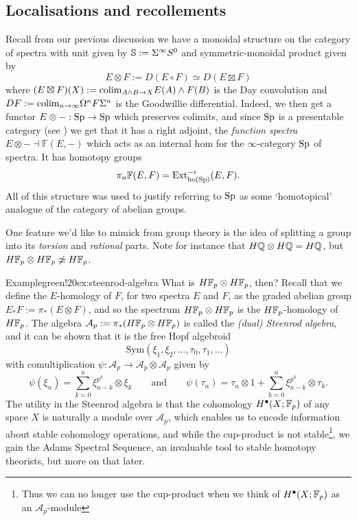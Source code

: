 \subsection{Localisations and recollements}\label{sec:localisations}

Recall from our previous discussion we have a monoidal structure on the category of spectra with unit given by $\S := \Sigma^\infty S^0$ and symmetric-monoidal product given by
	\[
	E \otimes F 
	:= D(E \circ F)
	\simeq D(E \boxtimes F)
	\]
	where $(E \boxtimes F)(X) := \colim_{A \wedge B \to X} E(A) \wedge F(B)$ is the Day convolution and $DF := \colim_{n\to\infty} \Omega^n F \Sigma^n$ is the Goodwillie differential. Indeed, we then get a functor $E\otimes-:\Sp\to\Sp$ which preserves colimits, and since $\Sp$ is a presentable category (see \cite{HA}) we get that it has a right adjoint, the \textit{function spectra} $E\otimes- \dashv \mathbb{F}(E,-)$ which acts as an internal hom for the $\infty$-category $\Sp$ of spectra. It has homotopy groups
	\[
	\pi_n \mathbb{F}(E,F) 
	= \text{Ext}^{-i}_{\text{ho}(\Sp)}(E, F).
	\]
All of this structure was used to justify referring to $\Sp$ as some `homotopical' analogue of the category of abelian groups. 

One feature we'd like to mimick from group theory is the idea of splitting a group into its \textit{torsion} and \textit{rational} parts. Note for instance that $H\Q \otimes H\Q = H\Q$, but $H\F_p \otimes H\F_p \not\simeq H\F_p$. 

\begin{env}{Example}{green!20}{ex:steenrod-algebra}
	What is $H\F_p \otimes H\F_p$, then? Recall that we define the $E$-homology of $F$, for two spectra $E$ and $F$, as the graded abelian group $E_\ast F := \pi_\ast(E \otimes F)$, and so the spectrum $H\F_p \otimes H\F_p$ is the $H\F_p$-homology of $H\F_p$. The algebra $\mathcal{A}_p := \pi_\ast(H\F_p \otimes H\F_p)$ is called the \textit{(dual) Steenrod algebra}, and it can be shown that it is the free Hopf algebroid 
	\[
	\text{Sym}(\xi_1,\xi_2,\dots,\tau_0,\tau_1,\dots)
	\]
with comultiplication $\psi : \mathcal{A}_p \to \mathcal{A}_p\otimes\mathcal{A}_p$ given by
	\[
	\psi(\xi_n) = \sum_{k=0}^n \xi_{n-k}^{p^k} \otimes \xi_k
	\qquad\text{and}\qquad 
	\psi(\tau_n) = \tau_n\otimes1 + \sum_{k=0}^n \xi_{n-k}^{p^k} \otimes \tau_k.
	\]
The utility in the Steenrod algebra is that the cohomology $H^\bullet(X;\F_p)$ of any space $X$ is naturally a module over $\mathcal{A}_p$, which enables us to encode information about stable cohomology operations, and while the cup-product is not stable\footnote{Thus we can no longer use the cup-product when we think of $H^\bullet(X;\F_p)$ as an $\mathcal{A}_p$-module}, we gain the Adams Spectral Sequence, an invaluable tool to stable homotopy theorists, but more on that later. 
\end{env}

